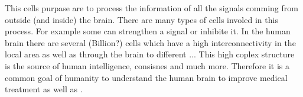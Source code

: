 This cells purpase are to process the information of all the signals comming from outside (and inside) the brain.
There are many types of cells involed in this process.
For example some can strengthen a signal or inhibite it.
In the human brain there are several (Billion?) cells which have a high interconnectivity in the local area as well as through the brain to different ...
This high coplex structure is the source of human intelligence, consisnes and much more.
Therefore it is a common goal of humanity to understand the human brain to improve medical treatment as well as \dummy{}.
% 
% 
% 
% 
